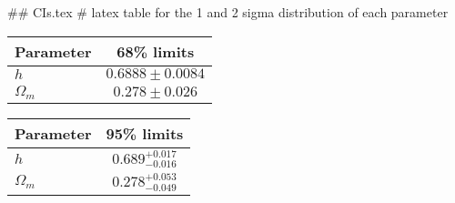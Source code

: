 ## CIs.tex
# latex table for the 1 and 2 sigma distribution of each parameter

\begin{tabular} { l  c}
 Parameter &  68\% limits\\
\hline
{\boldmath$h              $} & $0.6888\pm 0.0084          $\\
{\boldmath$\Omega_m       $} & $0.278\pm 0.026            $\\
\hline
\end{tabular}

\begin{tabular} { l  c}
 Parameter &  95\% limits\\
\hline
{\boldmath$h              $} & $0.689^{+0.017}_{-0.016}   $\\
{\boldmath$\Omega_m       $} & $0.278^{+0.053}_{-0.049}   $\\
\hline
\end{tabular}

